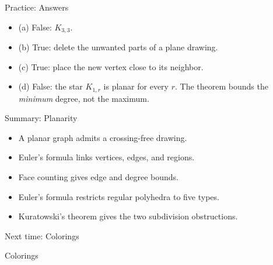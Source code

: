 \documentclass[aspectratio=169,11pt]{beamer}
\begin{document}
\begin{frame}{Practice: Answers}
\large
\begin{itemize}\setlength{\itemsep}{.25cm}
\item (a) False: $K_{3,3}$.
\item (b) True: delete the unwanted parts of a plane drawing.
\item (c) True: place the new vertex close to its neighbor.
\item (d) False: the star $K_{1,r}$ is planar for every $r$. The theorem bounds the \emph{minimum} degree, not the maximum.
\end{itemize}
\end{frame}
\begin{frame}{Summary: Planarity}
\large
\begin{itemize}\setlength{\itemsep}{.25cm}
\item A planar graph admits a crossing-free drawing.
\item Euler's formula links vertices, edges, and regions.
\item Face counting gives edge and degree bounds.
\item Euler's formula restricts regular polyhedra to five types.
\item Kuratowski's theorem gives the two subdivision obstructions.
\end{itemize}
\end{frame}
\begin{frame}{Next time: Colorings}\begin{center}{\Huge Colorings}\end{center}\end{frame}
\end{document}
